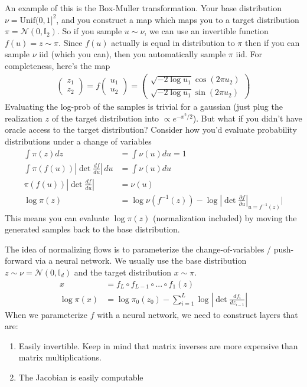 An example of this is the Box-Muller transformation. Your base distribution $\nu = \text{Unif}(0,1]^2$, and you construct a map which maps you to a target distribution $\pi = \mathcal N(0, \mathbb I_2)$. So if you sample $u \sim \nu$, we can use an invertible function $f(u) = z \sim \pi$. Since $f(u)$ actually is equal in distribution to $\pi$ then if you can sample $\nu$ iid (which you can), then you automatically sample $\pi$ iid.  For completeness, here's the map
\begin{align}
	\begin{pmatrix}
		z_1 \\ z_2
	\end{pmatrix} = f \begin{pmatrix}
		u_1 \\ u_2
 	\end{pmatrix} = \begin{pmatrix}
 		\sqrt{-2 \log u_1} \cos(2\pi u_2) \\ \sqrt{-2 \log u_1} \sin(2\pi u_2)
 	\end{pmatrix} 
 \end{align}
Evaluating the log-prob of the samples is trivial for a gaussian (just plug the realization $z$ of the target distribution into $\propto e^{-x^2/2}$). But what if you didn't have oracle access to the target distribution? Consider how you'd evaluate probability distributions under a change of variables
\begin{align}
	\int \pi(z) dz & = \int \nu(u) du = 1 \\
	\int  \pi(f(u)) \left | \det \frac{d f}{du} \right | \, du & = \int \nu(u) du\\
	\pi(f(u)) \left | \det \frac{d f}{du} \right | & = \nu(u)\\
	\log \pi(z) & =  \log \nu(f^{-1}(z))  - \log | \det \frac{\partial f}{\partial u }|_{u = f^{-1}(z)} |
\end{align}
This means you can evaluate $\log \pi(z)$ (normalization included) by moving the generated samples back to the base distribution.

The idea of normalizing flows is to parameterize the change-of-variables / push-forward via a neural network. We usually use the base distribution $z \sim \nu = \mathcal N(0, \mathbb I_d)$ and the target distribution $x \sim \pi$. 
\begin{align}
	x & = f_L \circ f_{L-1} \circ ... \circ  f_1(z)\\
	\log  \pi(x) & = \log \pi_0(z_0) - \sum_{i=1}^L \log \left | \det \frac{df_i}{dz_{i-1}}\right|
\end{align}
When we parameterize $f$ with a neural network, we need to construct layers that are:
\begin{enumerate}
	\item Easily invertible. Keep in mind that matrix inverses are more expensive than matrix multiplications.
	\item The Jacobian is easily computable
\end{enumerate}



